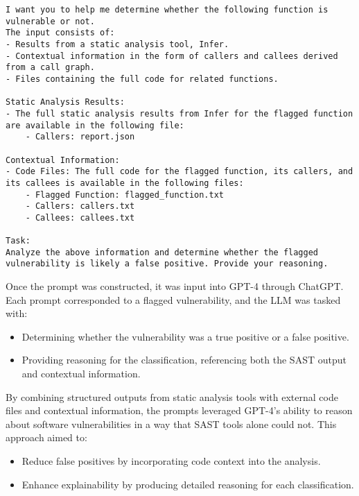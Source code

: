 \begin{lstlisting}[breaklines=true, caption={Prompt structure for GPT-4 analysis of flagged vulnerabilities.}, label={prompt}]
I want you to help me determine whether the following function is vulnerable or not.
The input consists of:
- Results from a static analysis tool, Infer.
- Contextual information in the form of callers and callees derived from a call graph.
- Files containing the full code for related functions.

Static Analysis Results:
- The full static analysis results from Infer for the flagged function are available in the following file:
    - Callers: report.json

Contextual Information:
- Code Files: The full code for the flagged function, its callers, and its callees is available in the following files:
    - Flagged Function: flagged_function.txt
    - Callers: callers.txt
    - Callees: callees.txt

Task:
Analyze the above information and determine whether the flagged vulnerability is likely a false positive. Provide your reasoning.
\end{lstlisting}

Once the prompt was constructed, it was input into GPT-4 through ChatGPT. Each prompt corresponded to a flagged vulnerability, and the LLM was tasked with:
\begin{itemize}
    \item Determining whether the vulnerability was a true positive or a false positive.
    \item Providing reasoning for the classification, referencing both the SAST output and contextual information.
\end{itemize}

By combining structured outputs from static analysis tools with external code files and contextual information, the prompts leveraged GPT-4’s ability to reason about software vulnerabilities in a way that SAST tools alone could not. This approach aimed to:
\begin{itemize}
    \item Reduce false positives by incorporating code context into the analysis.
    \item Enhance explainability by producing detailed reasoning for each classification.
\end{itemize}
